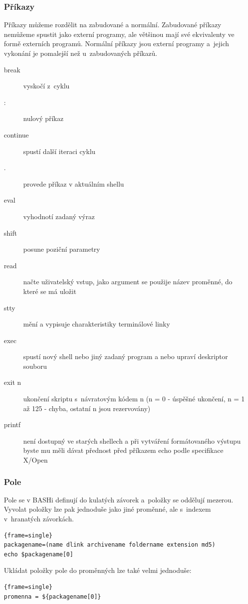 \documentclass[a4paper,12pt]{article}
\newenvironment{codeframe}{%
  \begin{Sbox} 
    \begin{minipage} 
      {\columnwidth-\leftmargin-\rightmargin-2\fboxsep-2\fboxrule-4pt} 
}{%

  \end{minipage} 
  \end{Sbox} 
  \begin{center} 
    \fcolorbox{black}{codeback}{\TheSbox} 
  \end{center} 
}
\begin{document}
\subsubsection{Příkazy}
Příkazy můžeme rozdělit na zabudované a normální. Zabudované příkazy nemůžeme spustit jako externí programy, ale většinou mají své ekvivalenty ve formě externích programů. Normální příkazy jsou externí programy a~jejich vykonání je pomalejší než u~zabudovaných příkazů\cite{ABC_SBASH}.
\begin{description}
 \item[break] vyskočí z~cyklu
 \item[:] nulový příkaz
 \item[continue] spustí další iteraci cyklu
 \item[.] provede příkaz v aktuálním shellu
 \item[eval] vyhodnotí zadaný výraz
 \item[shift] posune poziční parametry
 \item[read] načte uživatelský vstup, jako argument se použije název proměnné, do které se má uložit
 \item[stty] mění a vypisuje charakteristiky terminálové linky
 \item[exec] spustí nový shell nebo jiný zadaný program a nebo upraví deskriptor souboru
 \item[exit n] ukončení skriptu s~návratovým kódem n (n = 0 - úspěšné ukončení, n = 1 až 125 - chyba, ostatní n jsou rezervovány)
 \item[printf] není dostupný ve starých shellech a při vytváření formátovaného výstupu byste mu měli dávat přednost před příkazem echo podle specifikace X/Open
 \end{description}

\subsubsection{Pole}
Pole se v BASHi definují do kulatých závorek a~položky se oddělují mezerou. Vyvolat položky lze pak jednoduše jako jiné proměnné, ale s~indexem v~hranatých závorkách.~\cite{BASHen}
    \begin{codeframe}
      \begin{Verbatim}{frame=single}
packagename=(name dlink archivename foldername extension md5)
echo $packagename[0]
\end{Verbatim} 
    \end{codeframe}
Ukládat položky pole do proměnných lze také velmi jednoduše:
    \begin{codeframe}
      \begin{Verbatim}{frame=single}
promenna = ${packagename[0]}
\end{Verbatim} 
    \end{codeframe}
\end{document}
